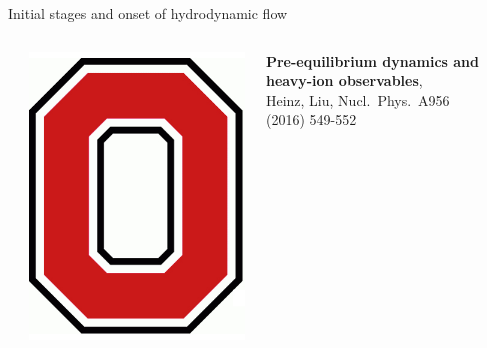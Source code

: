 \documentclass{beamer}
\begin{document}
\begin{frame}{Initial stages and onset of hydrodynamic flow}
\begin{columns}
  \end{columns}
  \vspace{.75cm}
  \begin{columns}
    \begin{column}{0.15\textwidth}
    \end{column}
    \begin{column}{0.05\textwidth}
      \raggedleft
      \includegraphics[width=.9\columnwidth]{osu}
    \end{column}
    \begin{column}{0.65\textwidth}
      \scriptsize {}
      \textbf{Pre-equilibrium dynamics and heavy-ion observables},\\
      Heinz, Liu, Nucl.\ Phys.\ A956 (2016) 549-552
    \end{column}
    \begin{column}{0.15\textwidth}
    \end{column}
  \end{columns}
\end{frame}
\end{document}

